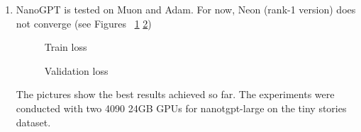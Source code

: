 \documentclass{article} %
\begin{document}
\begin{enumerate}
    \item NanoGPT is tested on Muon and Adam. For now, Neon (rank-1 version) does not converge (see Figures ~\ref{fig:train_loss} \ref{fig:val_loss})
    \begin{figure}[h!]
        \caption{Train loss}
        \label{fig:train_loss}
    \end{figure}
    \begin{figure}[h!]
        \caption{Validation loss}
        \label{fig:val_loss}
    \end{figure} 


    The pictures show the best results achieved so far. The experiments were conducted with two 4090 24GB GPUs for nanotgpt-large on the tiny stories dataset.
    

\end{enumerate}
\end{document}
